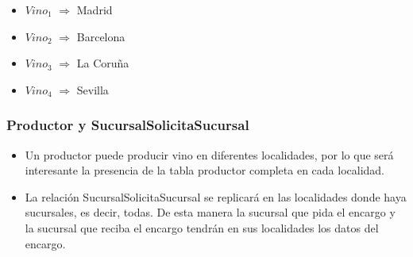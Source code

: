 \documentclass[paper=a4, fontsize=12pt]{article} %
\numberwithin{equation}{section} %
\numberwithin{figure}{section} %
\numberwithin{table}{section} %
\begin{document}
\begin{itemize}
\item $Vino_{1}$ $\Rightarrow$ Madrid
\item $Vino_{2}$ $\Rightarrow$ Barcelona
\item $Vino_{3}$ $\Rightarrow$ La Coruña
\item $Vino_{4}$ $\Rightarrow$ Sevilla
\end{itemize}

\subsubsection{Productor y SucursalSolicitaSucursal}
\begin{itemize}
\item Un productor puede producir vino en diferentes localidades, por lo que será interesante la presencia de la tabla productor completa en cada localidad.
\item La relación SucursalSolicitaSucursal se replicará en las localidades donde haya sucursales, es decir, todas. De esta manera la sucursal que pida el encargo y la sucursal que reciba el encargo tendrán en sus localidades los datos del encargo.
\end{itemize}
\end{document}
